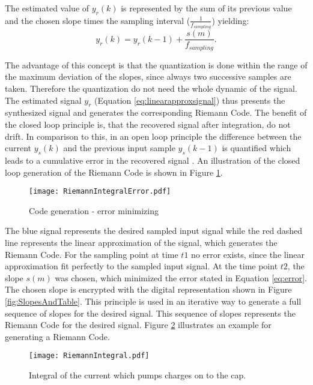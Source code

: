The estimated value of $y_r(k)$ is represented by the sum of its previous value and the chosen slope times the sampling interval ($\frac{1}{f_{sampling}}$) yielding:
\begin{equation}
	y_r(k) = y_r(k-1) + \frac{s(m)}{f_{sampling}}.
	\label{eq:linearapproxsignal}
\end{equation}

The advantage of this concept is that the quantization is done within the range of the maximum deviation of the slopes, since always two successive samples are taken.
Therefore the quantization do not need the whole dynamic of the signal.
The estimated signal $y_r$ (Equation \ref{eq:linearapproxsignal}) thus presents the synthesized signal and generates the corresponding Riemann Code.
The benefit of the closed loop principle is, that the recovered signal after integration, do not drift.
In comparison to this, in an open loop principle the difference between the current $y_s(k)$ and the previous input sample $y_s(k-1)$ is quantified which leads to a cumulative error in the recovered signal \cite{VeyracRivetDevalEtAl2016}.
An illustration of the closed loop generation of the Riemann Code is shown in Figure \ref{fig:RiemannIntegralError}.

 \begin{figure}[H]
	\centering
  \texttt{[image: RiemannIntegralError.pdf]}
	\caption{Code generation - error minimizing}
	\label{fig:RiemannIntegralError}
\end{figure}

The blue signal represents the desired sampled input signal while the red dashed line represents the linear approximation of the signal, which generates the Riemann Code.
For the sampling point at time $t1$ no error exists, since the linear approximation fit perfectly to the sampled input signal.
At the time point $t2$, the slope $s(m)$ was chosen, which minimized the error stated in Equation \ref{eq:error}.
The chosen slope is encrypted with the digital representation shown in Figure \ref{fig:SlopesAndTable}.
This principle is used in an iterative way to generate a full sequence of slopes for the desired signal.
This sequence of slopes represents the Riemann Code for the desired signal.
Figure \ref{fig:RiemannIntegral} illustrates an example for generating a Riemann Code.

\begin{figure}[H]
	\centering
  \texttt{[image: RiemannIntegral.pdf]}
	\caption{Integral of the current which pumps charges on to the cap.}
	\label{fig:RiemannIntegral}
\end{figure}

